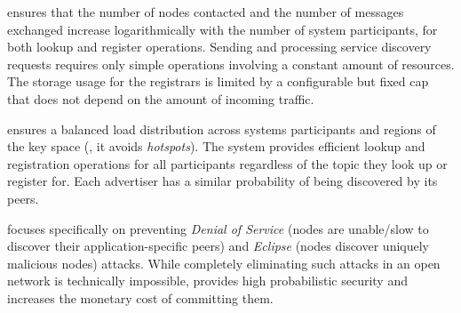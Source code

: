 \sysname ensures that the number of nodes contacted and the number of messages exchanged increase logarithmically with the number of system participants, for both lookup and register operations. 
Sending and processing service discovery requests requires only simple operations involving a constant amount of resources.
The storage usage for the registrars is limited by a configurable but fixed cap that does not depend on the amount of incoming traffic. 

\sysname ensures a balanced load distribution across systems participants and regions of the key space (\ie, it avoids \emph{hotspots}).
The system provides efficient lookup and registration operations for all participants regardless of the topic they look up or register for.
Each advertiser has a similar probability of being discovered by its peers. 

\sysname focuses specifically on preventing \emph{Denial of Service} (nodes are unable/slow to discover their application-specific peers) and \emph{Eclipse} (nodes discover uniquely malicious nodes) attacks.
While completely eliminating such attacks in an open network is technically impossible, \sysname provides high probabilistic security 
and increases the monetary cost of committing them. 
